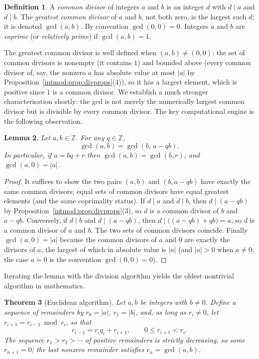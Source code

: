 \documentclass[11pt,a4paper]{article}
\newtheorem{theorem}{Theorem}[section]
\newtheorem{lemma}[theorem]{Lemma}
\theoremstyle{definition}
\newtheorem{definition}[theorem]{Definition}
\theoremstyle{remark}
\newcommand{\Z}{\ensuremath{\mathbb{Z}}}
\begin{document}
\begin{definition}\label{intmod:def:commondiv}
A \emph{common divisor} of integers \(a\) and \(b\) is an integer \(d\) with \(d\mid a\) and \(d\mid b\). The \emph{greatest common divisor} of \(a\) and \(b\), not both zero, is the largest such \(d\); it is denoted \(\gcd(a,b)\). By convention \(\gcd(0,0)=0\). Integers \(a\) and \(b\) are \emph{coprime} (or \emph{relatively prime}) if \(\gcd(a,b)=1\).
\end{definition}

The greatest common divisor is well defined when \((a,b)\neq(0,0)\): the set of common divisors is nonempty (it contains \(1\)) and bounded above (every common divisor of, say, the nonzero \(a\) has absolute value at most \(|a|\) by Proposition~\ref{intmod:prop:divprops}(4)), so it has a largest element, which is positive since \(1\) is a common divisor. We establish a much stronger characterisation shortly: the gcd is not merely the numerically largest common divisor but is divisible by every common divisor. The key computational engine is the following observation.

\begin{lemma}\label{intmod:lem:gcdreduce}
Let \(a,b\in\Z\). For any \(q\in\Z\),
\[
\gcd(a,b) = \gcd(b,\,a-qb).
\]
In particular, if \(a=bq+r\) then \(\gcd(a,b)=\gcd(b,r)\), and \(\gcd(a,0)=|a|\).
\end{lemma}

\begin{proof}
It suffices to show the two pairs \((a,b)\) and \((b,a-qb)\) have exactly the same common divisors; equal sets of common divisors have equal greatest elements (and the same coprimality status). If \(d\mid a\) and \(d\mid b\), then \(d\mid(a-qb)\) by Proposition~\ref{intmod:prop:divprops}(3), so \(d\) is a common divisor of \(b\) and \(a-qb\). Conversely, if \(d\mid b\) and \(d\mid(a-qb)\), then \(d\mid\bigl((a-qb)+qb\bigr)=a\), so \(d\) is a common divisor of \(a\) and \(b\). The two sets of common divisors coincide. Finally \(\gcd(a,0)=|a|\) because the common divisors of \(a\) and \(0\) are exactly the divisors of \(a\), the largest of which in absolute value is \(|a|\) (and \(|a|>0\) when \(a\neq 0\); the case \(a=0\) is the convention \(\gcd(0,0)=0\)).
\end{proof}

Iterating the lemma with the division algorithm yields the oldest nontrivial algorithm in mathematics.

\begin{theorem}[Euclidean algorithm]\label{intmod:thm:euclid}
Let \(a,b\) be integers with \(b\neq 0\). Define a sequence of remainders by \(r_0=|a|\), \(r_1=|b|\), and, as long as \(r_{i}\neq 0\), let \(r_{i+1}=r_{i-1}\bmod r_i\), so that
\[
r_{i-1}=r_i q_i + r_{i+1}, \qquad 0\le r_{i+1}<r_i.
\]
The sequence \(r_1>r_2>\cdots\) of positive remainders is strictly decreasing, so some \(r_{n+1}=0\); the last nonzero remainder satisfies \(r_n=\gcd(a,b)\).
\end{theorem}
\end{document}
